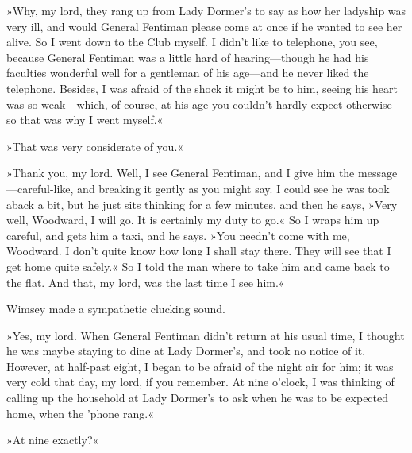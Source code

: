 »Why, my lord, they rang up from Lady Dormer's to say as how her ladyship was very ill, and would General Fentiman please come at once if he wanted to see her alive. So I went down to the Club myself. I didn't like to telephone, you see, because General Fentiman was a little hard of hearing—though he had his faculties wonderful well for a gentleman of his age—and he never liked the telephone. Besides, I was afraid of the shock it might be to him, seeing his heart was so weak—which, of course, at his age you couldn't hardly expect otherwise—so that was why I went myself.«

»That was very considerate of you.«

»Thank you, my lord. Well, I see General Fentiman, and I give him the message—careful-like, and breaking it gently as you might say. I could see he was took aback a bit, but he just sits thinking for a few minutes, and then he says, »Very well, Woodward, I will go. It is certainly my duty to go.« So I wraps him up careful, and gets him a taxi, and he says. »You needn't come with me, Woodward. I don't quite know how long I shall stay there. They will see that I get home quite safely.« So I told the man where to take him and came back to the flat. And that, my lord, was the last time I see him.«

Wimsey made a sympathetic clucking sound.

»Yes, my lord. When General Fentiman didn't return at his usual time, I thought he was maybe staying to dine at Lady Dormer's, and took no notice of it. However, at half-past eight, I began to be afraid of the night air for him; it was very cold that day, my lord, if you remember. At nine o'clock, I was thinking of calling up the household at Lady Dormer's to ask when he was to be expected home, when the 'phone rang.«

»At nine exactly?«

